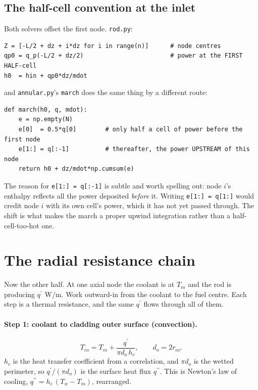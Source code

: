 \documentclass[11pt]{article}
\newcommand{\code}[1]{\texttt{#1}}
\newcommand{\qp}{q^{\prime}}
\newcommand{\qpp}{q^{\prime\prime}}
\begin{document}
\subsection{The half-cell convention at the inlet}

Both solvers offset the first node. \code{rod.py}:

\begin{lstlisting}
Z = [-L/2 + dz + i*dz for i in range(n)]      # node centres
qp0 = q_p(-L/2 + dz/2)                        # power at the FIRST HALF-cell
h0  = hin + qp0*dz/mdot
\end{lstlisting}

and \code{annular.py}'s \code{march} does the same thing by a different route:

\begin{lstlisting}
def march(h0, q, mdot):
    e = np.empty(N)
    e[0]  = 0.5*q[0]        # only half a cell of power before the first node
    e[1:] = q[:-1]          # thereafter, the power UPSTREAM of this node
    return h0 + dz/mdot*np.cumsum(e)
\end{lstlisting}

The reason for \code{e[1:] = q[:-1]} is subtle and worth spelling out: node $i$'s
enthalpy reflects all the power deposited \emph{before} it. Writing \code{e[1:] = q[1:]}
would credit node $i$ with its own cell's power, which it has not yet passed through.
The shift is what makes the march a proper upwind integration rather than a
half-cell-too-hot one.

\section{The radial resistance chain}
\label{sec:chain}

Now the other half. At one axial node the coolant is at $T_m$ and the rod is producing
$\qp$ W/m. Work outward-in from the coolant to the fuel centre. Each step is a thermal
resistance, and the same $\qp$ flows through all of them.

\paragraph{Step 1: coolant to cladding outer surface (convection).}
\begin{equation}
T_{co} = T_m + \frac{\qp}{\pi d_o \, h_c}, \qquad d_o = 2 r_{co}.
\end{equation}
$h_c$ is the heat transfer coefficient from a correlation, and $\pi d_o$ is the wetted
perimeter, so $\qp/(\pi d_o)$ is the surface heat flux $\qpp$. This is Newton's law of
cooling, $\qpp = h_c\,(T_w - T_m)$, rearranged.
\end{document}

